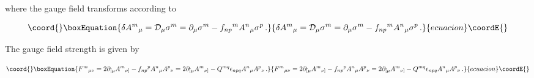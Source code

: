 \documentclass[12pt,a4paper]{article}
\begin{document}
\noindent where the gauge field transforms according to

\begin{equation}\coord{}\boxEquation{
\delta A^{m}{}_{\mu}= {\cal D}_{\mu}\sigma^{m}= 
\partial_{\mu}\sigma^{m}-f_{np}{}^{m}A^{n}{}_{\mu}\sigma^{p}\, .
}{
\delta A^{m}{}_{\mu}= {\cal D}_{\mu}\sigma^{m}= 
\partial_{\mu}\sigma^{m}-f_{np}{}^{m}A^{n}{}_{\mu}\sigma^{p}\, .
}{ecuacion}\coordE{}\end{equation}

The gauge field strength is given by

\begin{equation}\coord{}\boxEquation{
F^{m}{}_{\mu\nu} = 2\partial_{[\mu}A^{m}{}_{\nu]} 
-f_{np}{}^{p}A^{n}{}_{\mu}A^{p}{}_{\nu}=
 2\partial_{[\mu}A^{m}{}_{\nu]} 
-Q^{mq}\epsilon_{npq}A^{n}{}_{\mu}A^{p}{}_{\nu}\, .   
}{
F^{m}{}_{\mu\nu} = 2\partial_{[\mu}A^{m}{}_{\nu]} 
-f_{np}{}^{p}A^{n}{}_{\mu}A^{p}{}_{\nu}=
 2\partial_{[\mu}A^{m}{}_{\nu]} 
-Q^{mq}\epsilon_{npq}A^{n}{}_{\mu}A^{p}{}_{\nu}\, .   
}{ecuacion}\coordE{}\end{equation}
\end{document}
